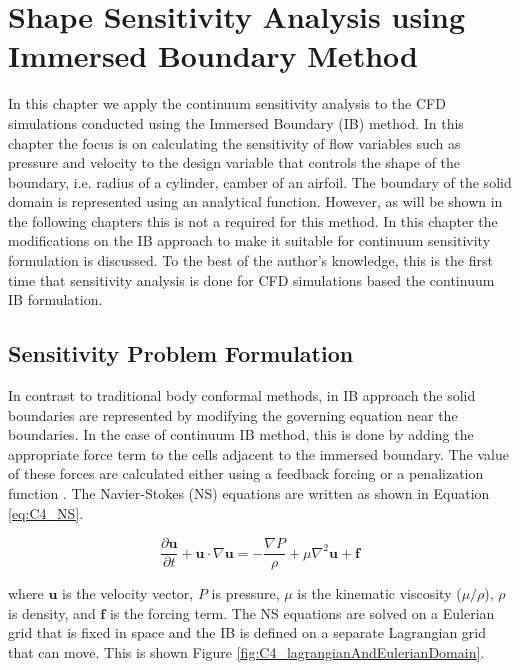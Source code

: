 \chapter{Shape Sensitivity Analysis using Immersed Boundary Method}
In this chapter we apply the continuum sensitivity analysis to the CFD simulations conducted using the Immersed Boundary (IB) method. In this chapter the focus is on calculating the sensitivity of flow variables such as pressure and velocity to the design variable that controls the shape of the boundary, i.e. radius of a cylinder, camber of an airfoil. The boundary of the solid domain is represented using an analytical function. However, as will be shown in the following chapters this is not a required for this method. In this chapter the modifications on the IB approach to make it suitable for continuum sensitivity formulation is discussed. To the best of the author's knowledge, this is the first time that sensitivity analysis is done for CFD simulations based the continuum IB formulation.
\section{Sensitivity Problem Formulation}
In contrast to traditional body conformal methods, in IB approach the solid boundaries are represented by modifying the governing equation near the boundaries. In the case of continuum IB method, this is done by adding the appropriate force term to the cells adjacent to the immersed boundary. The value of these forces are calculated either using a feedback forcing \cite{goldstein1993modeling} or a penalization function \cite{arquis1984conditions}. The Navier-Stokes (NS) equations are written as shown in Equation \eqref{eq:C4_NS}.

\begin{equation}\label{eq:C4_NS}
	\frac{\partial \mathbf{u}}{\partial t} + \mathbf{u} \cdot \nabla \mathbf{u} = 
	-\frac{\nabla P}{\rho} + \mu \nabla^2 \mathbf{u} + \mathbf{f}
\end{equation}

where $\mathbf{u}$ is the velocity vector, $P$ is pressure, $\mu$ is the kinematic viscosity ($\mu / \rho$), $\rho$ is density, and $\mathbf{f}$ is the forcing term. The NS equations are solved on a Eulerian grid that is fixed in space and the IB is defined on a separate Lagrangian grid that can move. This is shown Figure \ref{fig:C4_lagrangianAndEulerianDomain}.

